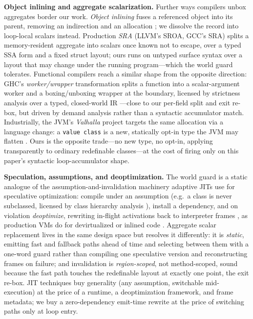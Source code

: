 \documentclass[sigplan,screen,review,anonymous]{acmart}
\begin{document}
\textbf{Object inlining and aggregate scalarization.} Further ways
compilers unbox aggregates border our work. \emph{Object inlining} fuses a
referenced object into its parent, removing an indirection and an
allocation \cite{dolby2000automatic}; we dissolve the record into
loop-local scalars instead. Production \emph{SRA} (LLVM's SROA, GCC's
SRA) splits a memory-resident aggregate into scalars once known not
to escape, over a typed SSA form and a fixed struct
layout; ours runs on untyped surface syntax over a layout that may change
under the running program---which the world guard tolerates. Functional
compilers reach a similar shape from the opposite direction: GHC's
\emph{worker/wrapper} transformation splits a function into a
scalar-argument worker and a boxing/unboxing wrapper at the boundary,
licensed by strictness analysis over a typed, closed-world
IR \cite{gill2009worker}---close to our per-field split and exit re-box,
but driven by demand analysis rather than a syntactic accumulator match.
Industrially, the JVM's \emph{Valhalla} project targets the same
allocation via a language change: a \texttt{value class} is a new,
statically opt-in type the JVM may flatten \cite{goetz2021valhalla}. Ours
is the opposite trade---no new type, no opt-in, applying transparently to
ordinary redefinable classes---at the cost of firing only on this
paper's syntactic loop-accumulator shape.

\textbf{Speculation, assumptions, and deoptimization.} The world guard is a
static analogue of the assumption-and-invalidation machinery adaptive
JITs use for speculative optimization: compile under an assumption
(e.g.\ a class is never subclassed, licensed by class hierarchy analysis
\cite{dean1995cha}), install a dependency, and on violation
\emph{deoptimize}, rewriting in-flight
activations back to interpreter frames \cite{holzle1992deopt}, as
production VMs do for devirtualized or inlined code
\cite{paleczny2001hotspot,detlefs1999inlining,duboscq2013speculative}.
Aggregate scalar replacement lives in the same design space but resolves
it differently: it is \emph{static}, emitting fast and fallback paths
ahead of time and selecting between them with a one-word guard rather
than compiling one speculative version and reconstructing frames on
failure; and invalidation is \emph{region-scoped}, not method-scoped,
sound because the fast path touches the redefinable layout at exactly one
point, the exit re-box. JIT techniques buy generality (any assumption,
switchable mid-execution) at the price of a runtime, a deoptimization
framework, and frame metadata; we buy a zero-dependency emit-time rewrite
at the price of switching paths only at loop entry.
\end{document}
